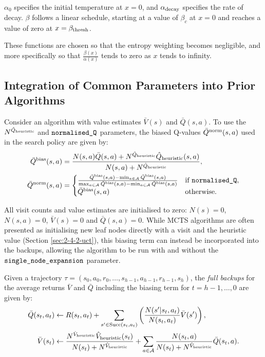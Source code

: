     $\alpha_0$ specifies the initial temperature at $x=0$, and ${\alpha_{\text{decay}}}$ specifies the rate of decay. $\beta$ follows a linear schedule, starting at a value of $\beta_c$ at $x=0$ and reaches a value of zero at $x={\beta_{\text{thresh}}}$.

    These functions are chosen so that the entropy weighting becomes negligible, and more specifically so that $\frac{\beta(x)}{\alpha(x)}$ tends to zero as $x$ tends to infinity.


\subsection{Integration of Common Parameters into Prior Algorithms}
\label{appsec:4:bias_term_integration}

    Consider an algorithm with value estimates $\bar{V}(s)$ and $\bar{Q}(s,a)$. To use the $N^{{\hat{Q}_{\textnormal{heuristic}}}}$ and ${\textnormal{\texttt{normalised\_Q}}}$ parameters, the biased Q-values ${\bar{Q}^{{\textnormal{norm}}}}(s,a)$ used in the search policy are given by:
    \begin{align}
        {\bar{Q}^{{\textnormal{bias}}}}(s,a) &= \frac{N(s,a) \bar{Q}(s,a) +  N^{{\hat{Q}_{\textnormal{heuristic}}}} {\hat{Q}_{\textnormal{heuristic}}}(s,a)}{N(s,a)+N^{{\hat{Q}_{\textnormal{heuristic}}}}}, \\
        {\bar{Q}^{{\textnormal{norm}}}}(s,a) &= 
        \begin{cases}
            \frac{{\bar{Q}^{{\textnormal{bias}}}}(s,a)-\min_{a\in\mathcal{A}}{\bar{Q}^{{\textnormal{bias}}}}(s,a)}{\max_{a\in\mathcal{A}}{\bar{Q}^{{\textnormal{bias}}}}(s,a)-\min_{a\in\mathcal{A}}{\bar{Q}^{{\textnormal{bias}}}}(s,a)} & \text{if } {\textnormal{\texttt{normalised\_Q}}}, \\
            {\bar{Q}^{{\textnormal{bias}}}}(s,a) & \text{otherwise.}
        \end{cases}
    \end{align}

    All visit counts and value estimates are initialised to zero: $N(s)=0$, $N(s,a)=0$, $\bar{V}(s)=0$ and $\bar{Q}(s,a)=0$. While MCTS algorithms are often presented as initialising new leaf nodes directly with a visit and the heuristic value (Section \ref{sec:2-4-2-uct}), this biasing term can instead be incorporated into the backups, allowing the algorithm to be run with and without the ${\textnormal{\texttt{single\_node\_expansion}}}$ parameter.
    
    Given a trajectory $\tau=(s_0,a_0,r_0,\ldots,s_{h-1},a_{h-1},r_{h-1},s_h)$, the \textit{full backups} for the average returns $\bar{V}$ and $\bar{Q}$ including the biasing term for $t=h-1,\ldots,0$ are given by:
    \begin{align}
        \bar{Q}(s_t,a_t) &\leftarrow 
            R(s_t,a_t) + \sum_{s' \in {\textnormal{Succ}(s_t,a_t)}} \left( \frac{N(s'|s_t,a_t)}{N(s_t,a_t)} \bar{V}(s') \right), 
                    \\ 
        \bar{V}(s_t) &\leftarrow \frac{N^{{\hat{V}_{\textnormal{heuristic}}}} {\hat{V}_{\textnormal{heuristic}}}(s_t)}{N(s_t)+N^{{\hat{V}_{\textnormal{heuristic}}}}} 
            + \sum_{a\in\mathcal{A}} \frac{N(s_t,a)}{N(s_t)+N^{{\hat{V}_{\textnormal{heuristic}}}}} \bar{Q}(s_t,a).
    \end{align}

